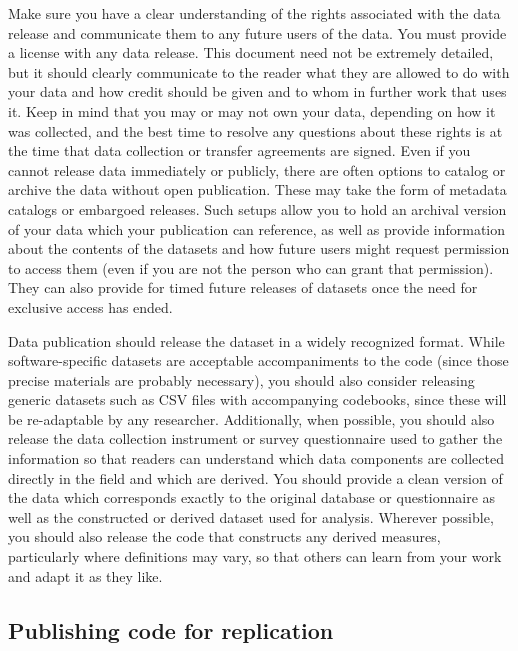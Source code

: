 Make sure you have a clear understanding of the rights associated with the data release
and communicate them to any future users of the data.
You must provide a license with any data release.
This document need not be extremely detailed,
but it should clearly communicate to the reader what they are allowed to do with your data and
how credit should be given and to whom in further work that uses it.
Keep in mind that you may or may not own your data,
depending on how it was collected,
and the best time to resolve any questions about these rights
is at the time that data collection or transfer agreements are signed.
Even if you cannot release data immediately or publicly,
there are often options to catalog or archive the data without open publication.
These may take the form of metadata catalogs or embargoed releases.
Such setups allow you to hold an archival version of your data
which your publication can reference,
as well as provide information about the contents of the datasets
and how future users might request permission to access them
(even if you are not the person who can grant that permission).
They can also provide for timed future releases of datasets
once the need for exclusive access has ended.

Data publication should release the dataset in a widely recognized format.
While software-specific datasets are acceptable accompaniments to the code
(since those precise materials are probably necessary),
you should also consider releasing generic datasets
such as CSV files with accompanying codebooks,
since these will be re-adaptable by any researcher.
Additionally, when possible, you should also release
the data collection instrument or survey questionnaire used to gather the information
so that readers can understand which data components are
collected directly in the field and which are derived.
You should provide a clean version of the data
which corresponds exactly to the original database or questionnaire
as well as the constructed or derived dataset used for analysis.
Wherever possible, you should also release the code
that constructs any derived measures,
particularly where definitions may vary,
so that others can learn from your work and adapt it as they like.

\subsection{Publishing code for replication}

